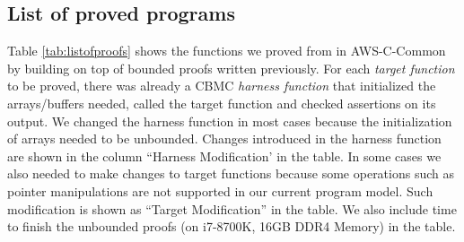 \subsection{List of proved programs}
Table \ref{tab:listofproofs} shows the functions we proved from in
AWS-C-Common by building on top of bounded proofs written
previously. For each \emph{target function} to be proved, there was
already a CBMC \emph{harness function} that initialized the
arrays/buffers needed, called the target function and checked
assertions on its output. We changed the harness function in most
cases because the initialization of arrays needed to be
unbounded. Changes introduced in the harness function are shown in the
column ``Harness Modification' in the table.  In some cases we also
needed to make changes to target functions because some operations
such as pointer manipulations are not supported in our current program
model. Such modification is shown as ``Target Modification'' in the
table.  We also include time to finish the
unbounded proofs (on i7-8700K, 16GB DDR4 Memory) in the table.

